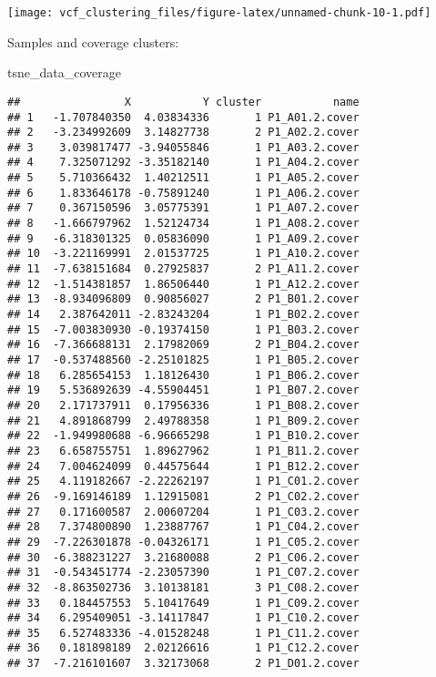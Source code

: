 \documentclass[]{article}
\newenvironment{Shaded}{\begin{snugshade}}{\end{snugshade}}
\newcommand{\NormalTok}[1]{{#1}}
\begin{document}
\texttt{[image: vcf\_clustering\_files/figure-latex/unnamed-chunk-10-1.pdf]}

Samples and coverage clusters:

\begin{Shaded}
\begin{Highlighting}[]
\NormalTok{tsne_data_coverage}
\end{Highlighting}
\end{Shaded}

\begin{verbatim}
##                X           Y cluster           name
## 1   -1.707840350  4.03834336       1 P1_A01.2.cover
## 2   -3.234992609  3.14827738       2 P1_A02.2.cover
## 3    3.039817477 -3.94055846       1 P1_A03.2.cover
## 4    7.325071292 -3.35182140       1 P1_A04.2.cover
## 5    5.710366432  1.40212511       1 P1_A05.2.cover
## 6    1.833646178 -0.75891240       1 P1_A06.2.cover
## 7    0.367150596  3.05775391       1 P1_A07.2.cover
## 8   -1.666797962  1.52124734       1 P1_A08.2.cover
## 9   -6.318301325  0.05836090       1 P1_A09.2.cover
## 10  -3.221169991  2.01537725       1 P1_A10.2.cover
## 11  -7.638151684  0.27925837       2 P1_A11.2.cover
## 12  -1.514381857  1.86506440       1 P1_A12.2.cover
## 13  -8.934096809  0.90856027       2 P1_B01.2.cover
## 14   2.387642011 -2.83243204       1 P1_B02.2.cover
## 15  -7.003830930 -0.19374150       1 P1_B03.2.cover
## 16  -7.366688131  2.17982069       2 P1_B04.2.cover
## 17  -0.537488560 -2.25101825       1 P1_B05.2.cover
## 18   6.285654153  1.18126430       1 P1_B06.2.cover
## 19   5.536892639 -4.55904451       1 P1_B07.2.cover
## 20   2.171737911  0.17956336       1 P1_B08.2.cover
## 21   4.891868799  2.49788358       1 P1_B09.2.cover
## 22  -1.949980688 -6.96665298       1 P1_B10.2.cover
## 23   6.658755751  1.89627962       1 P1_B11.2.cover
## 24   7.004624099  0.44575644       1 P1_B12.2.cover
## 25   4.119182667 -2.22262197       1 P1_C01.2.cover
## 26  -9.169146189  1.12915081       2 P1_C02.2.cover
## 27   0.171600587  2.00607204       1 P1_C03.2.cover
## 28   7.374800890  1.23887767       1 P1_C04.2.cover
## 29  -7.226301878 -0.04326171       1 P1_C05.2.cover
## 30  -6.388231227  3.21680088       2 P1_C06.2.cover
## 31  -0.543451774 -2.23057390       1 P1_C07.2.cover
## 32  -8.863502736  3.10138181       3 P1_C08.2.cover
## 33   0.184457553  5.10417649       1 P1_C09.2.cover
## 34   6.295409051 -3.14117847       1 P1_C10.2.cover
## 35   6.527483336 -4.01528248       1 P1_C11.2.cover
## 36   0.181898189  2.02126616       1 P1_C12.2.cover
## 37  -7.216101607  3.32173068       2 P1_D01.2.cover

\end{verbatim}
\end{document}
